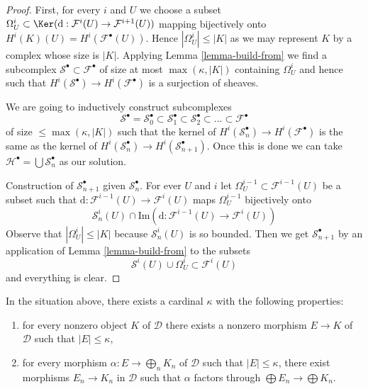 \begin{proof}
First, for every $i$ and $U$ we choose a subset
$\Omega^i_U \subset \Ker(\text{d} :
\mathcal{F}^i(U) \to \mathcal{F}^{i + 1}(U))$
mapping bijectively onto
$H^i(K)(U) = H^i(\mathcal{F}^\bullet(U))$.
Hence $|\Omega^i_U| \leq |K|$ as we may represent $K$ by
a complex whose size is $|K|$.
Applying Lemma \ref{lemma-build-from}
we find a subcomplex $\mathcal{S}^\bullet \subset \mathcal{F}^\bullet$
of size at most $\max(\kappa, |K|)$ containing $\Omega^i_U$
and hence such that $H^i(\mathcal{S}^\bullet) \to H^i(\mathcal{F}^\bullet)$
is a surjection of sheaves.

\medskip\noindent
We are going to inductively construct subcomplexes
$$
\mathcal{S}^\bullet =
\mathcal{S}_0^\bullet \subset
\mathcal{S}_1^\bullet \subset
\mathcal{S}_2^\bullet \subset \ldots \subset \mathcal{F}^\bullet
$$
of size $\leq \max(\kappa, |K|)$ such that
the kernel of $H^i(\mathcal{S}_n^\bullet) \to H^i(\mathcal{F}^\bullet)$
is the same as the kernel of
$H^i(\mathcal{S}_n^\bullet) \to H^i(\mathcal{S}_{n + 1}^\bullet)$.
Once this is done we can take
$\mathcal{H}^\bullet = \bigcup \mathcal{S}_n^\bullet$ as our solution.

\medskip\noindent
Construction of $\mathcal{S}_{n + 1}^\bullet$ given
$\mathcal{S}_n^\bullet$. For ever $U$ and $i$ let
$\Omega^{i - 1}_U \subset \mathcal{F}^{i - 1}(U)$ be a subset
such that $\text{d} : \mathcal{F}^{i - 1}(U) \to \mathcal{F}^i(U)$
maps $\Omega^{i - 1}_U$ bijectively onto
$$
\mathcal{S}_n^i(U) \cap
\text{Im}(\text{d} : \mathcal{F}^{i - 1}(U)\to \mathcal{F}^i(U))
$$
Observe that $|\Omega^i_U| \leq |K|$ because $\mathcal{S}_n^i(U)$
is so bounded. Then we get $\mathcal{S}_{n + 1}^\bullet$ by an
application of Lemma \ref{lemma-build-from} to the subsets
$$
\mathcal{S}^i(U) \cup \Omega^i_U \subset \mathcal{F}^i(U)
$$
and everything is clear.
\end{proof}

\begin{lemma}
\label{lemma-cartesian-colimit-kappa}
In the situation above, there exists a cardinal $\kappa$ with the following
properties:
\begin{enumerate}
\item for every nonzero object $K$ of $\mathcal{D}$ there exists a
nonzero morphism $E \to K$ of $\mathcal{D}$ such that $|E| \leq \kappa$,
\item for every morphism $\alpha : E \to \bigoplus_n K_n$ of $\mathcal{D}$
such that $|E| \leq \kappa$, there exist morphisms $E_n \to K_n$
in $\mathcal{D}$ such that $\alpha$ factors through
$\bigoplus E_n \to \bigoplus K_n$.
\end{enumerate}
\end{lemma}

